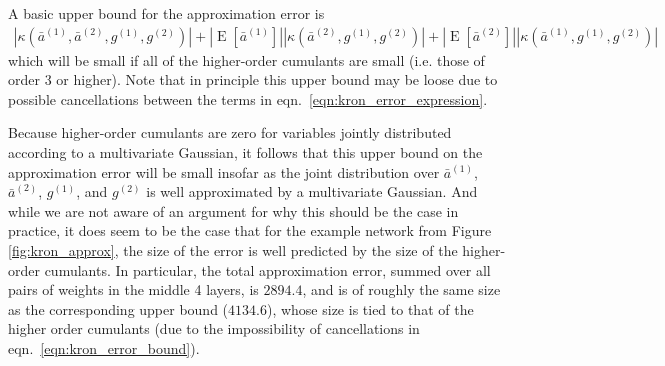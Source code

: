 \documentclass[12pt]{article}
\newcommand{\expected}{\operatorname{E}}
\newtheorem{proposition}[theorem]{Proposition}
\begin{document}
A basic upper bound for the approximation error is
\begin{align}
\label{eqn:kron_error_bound}
|\kappa(\bar{a}^{(1)}, \bar{a}^{(2)}, g^{(1)}, g^{(2)})| + |\expected[ \bar{a}^{(1)} ]| |\kappa(\bar{a}^{(2)}, g^{(1)}, g^{(2)})| + |\expected[\bar{a}^{(2)}]| |\kappa(\bar{a}^{(1)}, g^{(1)}, g^{(2)})|
\end{align}
which will be small if all of the higher-order cumulants are small (i.e. those of order 3 or higher).  Note that in principle this upper bound may be loose due to possible cancellations between the terms in eqn.~\ref{eqn:kron_error_expression}.

Because higher-order cumulants are zero for variables jointly distributed according to a multivariate Gaussian, it follows that this upper bound on the approximation error will be small insofar as the joint distribution over $\bar{a}^{(1)}$, $\bar{a}^{(2)}$, $g^{(1)}$, and $g^{(2)}$ is well approximated by a multivariate Gaussian.  And while we are not aware of an argument for why this should be the case in practice, it does seem to be the case that for the example network from Figure \ref{fig:kron_approx}, the size of the error is well predicted by the size of the higher-order cumulants.  In particular, the total approximation error, summed over all pairs of weights in the middle 4 layers, is $2894.4$, and is of roughly the same size as the corresponding upper bound ($4134.6$), whose size is tied to that of the higher order cumulants (due to the impossibility of cancellations in eqn.~\ref{eqn:kron_error_bound}).




\end{document}

